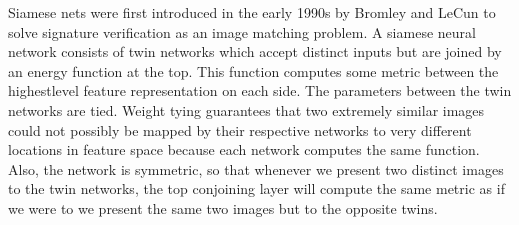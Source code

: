Siamese nets were first introduced in the early 1990s by Bromley and LeCun to solve signature verification as an image matching problem. A siamese neural network consists of twin networks which accept distinct inputs but are joined by an energy function at the top. This function computes some metric between the highestlevel feature representation on each side. The
parameters between the twin networks are tied. Weight tying guarantees that two extremely similar images could not possibly be mapped by their respective networks to very different locations in feature space because each network computes the same function. Also, the network is symmetric, so that whenever we present two distinct images to the twin networks, the top conjoining layer will compute the same metric as if we were to we present the same two images
but to the opposite twins.
